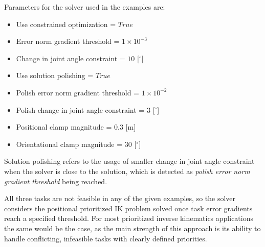 Parameters for the solver used in the examples are:
\begin{itemize}
    \item Use constrained optimization = $True$
    \item Error norm gradient threshold = $1\times 10^{-3}$
    \item Change in joint angle constraint = $10$ [$^{\circ}$]
    \item Use solution polishing = $True$
    \item Polish error norm gradient threshold = $1\times 10^{-2}$
    \item Polish change in joint angle constraint = $3$ [$^{\circ}$]
    \item Positional clamp magnitude = $0.3$ [m]
    \item Orientational clamp magnitude = $30$  [$^{\circ}$]
\end{itemize}

Solution polishing refers to the usage of smaller change in joint angle constraint when the solver is close to the solution, which is detected as \textit{polish error norm gradient threshold} being reached.  
\begin{comment}
\begin{table}[]
    \centering
    \begin{tabular}{c|c|c|c|c}
        Example &               1 & 2 & 3 & 4\\
        Task 1 error [m] &      0.0015632 & 0.0015632 & 0.0015632 & 5.74\\
        Task 2 error [rad] &    0.0015632 & 0.0015632 & 0.0015632 & 5.74 \\
        Task 3 error [m] &      0.0015632 & 0.0015632 & 0.0015632 & 5.74\\
        Time [ms] &             0.0015632 & 0.00126516 & 0.78838 & 5.74 
    \end{tabular}
    \caption{Caption}
    \label{tab:my_label}
\end{table}
\end{comment}

All three tasks are not feasible in any of the given examples, so the solver considers the positional prioritized IK problem solved once task error gradients reach a specified threshold. For most prioritized inverse kinematics applications the same would be the case, as the main strength of this approach is its ability to handle conflicting, infeasible tasks with clearly defined priorities. 
